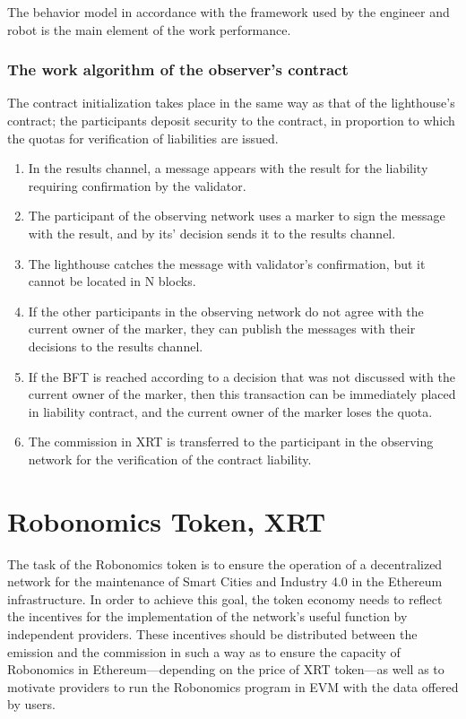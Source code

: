 \documentclass{article}
\begin{document}
The behavior model in accordance with the framework used by the engineer and robot is the main element of the work performance.

\subsubsection{The work algorithm of the observer’s contract}

The contract initialization takes place in the same way as that of the lighthouse’s contract; the participants deposit security to the contract, in proportion to which the quotas for verification of liabilities are issued.
\begin{enumerate}
	\item In the results channel, a message appears with the result for the liability requiring confirmation by the validator.
	\item The participant of the observing network uses a marker to sign the message with the result, and by its’ decision sends it to the results channel.
	\item The lighthouse catches the message with validator’s confirmation, but it cannot be located in N blocks.
	\item If the other participants in the observing network do not agree with the current owner of the marker, they can publish the messages with their decisions to the results channel.
	\item If the BFT is reached according to a decision that was not discussed with the current owner of the marker, then this transaction can be immediately placed in liability contract, and the current owner of the marker loses the quota.
	\item The commission in XRT is transferred to the participant in the observing network for the verification of the contract liability.
\end{enumerate}

\section{Robonomics Token, XRT}

The task of the Robonomics token is to ensure the operation of a decentralized network for the maintenance of Smart Cities and Industry 4.0 in the Ethereum infrastructure. In order to achieve this goal, the token economy needs to reflect the incentives for the implementation of the network’s useful function by independent providers. These incentives should be distributed between the emission and the commission in such a way as to ensure the capacity of Robonomics in Ethereum—depending on the price of XRT token—as well as to motivate providers to run the Robonomics program in EVM with the data offered by users.
\end{document}

